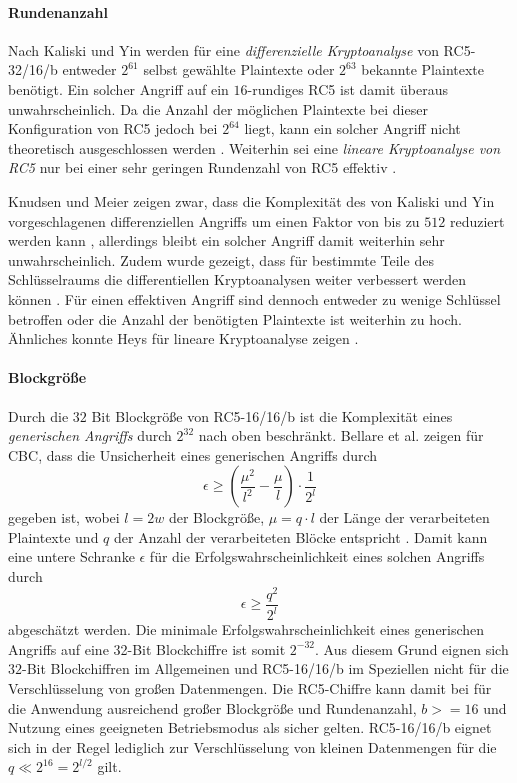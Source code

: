 \documentclass[course=erap]{aspdoc}
\begin{document}
\paragraph{Rundenanzahl} Nach Kaliski und Yin werden für eine \textit{differenzielle Kryptoanalyse} von RC5-32/16/b entweder $2^{61}$ selbst gewählte Plaintexte oder $2^{63}$ bekannte Plaintexte benötigt. Ein solcher Angriff auf ein $16$-rundiges RC5 ist damit überaus unwahrscheinlich. Da die Anzahl der möglichen Plaintexte bei dieser Konfiguration von RC5 jedoch bei $2^{64}$ liegt, kann ein solcher Angriff nicht theoretisch ausgeschlossen werden \cite[p.6]{kaliski+yin}. Weiterhin sei eine \textit{lineare Kryptoanalyse von RC5} nur bei einer sehr geringen Rundenzahl von RC5 effektiv \cite[p.28]{kaliski+yin}.\bigbreak

Knudsen und Meier zeigen zwar, dass die Komplexität des von Kaliski und Yin vorgeschlagenen differenziellen Angriffs um einen Faktor von bis zu $512$ reduziert werden kann \cite[p.2]{knudsen+meier}, allerdings bleibt ein solcher Angriff damit weiterhin sehr unwahrscheinlich. Zudem wurde gezeigt, dass für bestimmte Teile des Schlüsselraums die differentiellen Kryptoanalysen weiter verbessert werden können \cite[p.13]{knudsen+meier}. Für einen effektiven Angriff sind dennoch entweder zu wenige Schlüssel betroffen oder die Anzahl der benötigten Plaintexte ist weiterhin zu hoch. Ähnliches konnte Heys für lineare Kryptoanalyse zeigen \cite[p.5]{heys}.

\paragraph{Blockgröße} Durch die $32$ Bit Blockgröße von RC5-16/16/b ist die Komplexität eines \textit{generischen Angriffs} durch $2^{32}$ nach oben beschränkt. Bellare et al. zeigen für CBC, dass die Unsicherheit eines generischen Angriffs durch
\[
    \epsilon \geq \left(\frac{\mu^2}{l^2} - \frac{\mu}{l}\right) \cdot \frac{1}{2^l}
\]
gegeben ist, wobei $l = 2w$ der Blockgröße, $\mu = q \cdot l$ der Länge der verarbeiteten Plaintexte und $q$ der Anzahl der verarbeiteten Blöcke entspricht \cite[p.5;24]{bellare}. Damit kann eine untere Schranke $\epsilon$ für die Erfolgswahrscheinlichkeit eines solchen Angriffs durch
\[
    \epsilon \geq \frac{q^2}{2^l}
\]
abgeschätzt werden. Die minimale Erfolgswahrscheinlichkeit eines generischen Angriffs auf eine 32-Bit Blockchiffre ist somit $2^{-32}$. Aus diesem Grund eignen sich $32$-Bit Blockchiffren im Allgemeinen und RC5-16/16/b im Speziellen nicht für die Verschlüsselung von großen Datenmengen. Die RC5-Chiffre kann damit bei für die Anwendung ausreichend großer Blockgröße und Rundenanzahl, $b >= 16$ und Nutzung eines geeigneten Betriebsmodus als sicher gelten. RC5-16/16/b eignet sich in der Regel lediglich zur Verschlüsselung von kleinen Datenmengen für die $q \ll 2^{16} = 2^{l/2}$ gilt.
\end{document}
